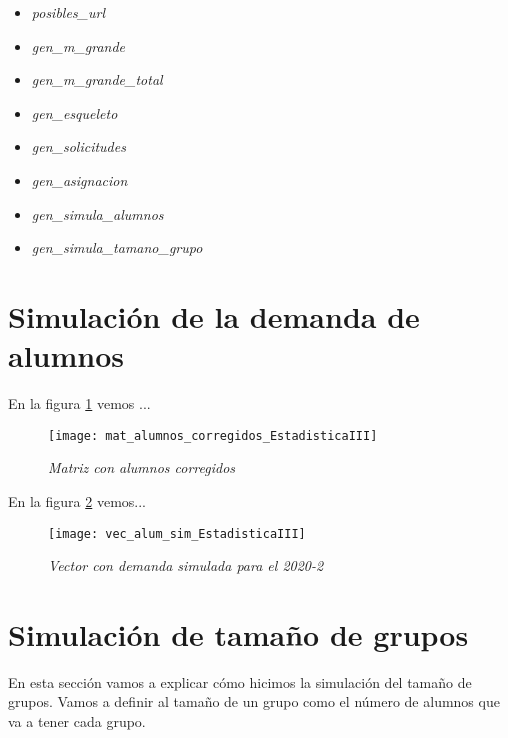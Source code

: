 \begin{itemize}
\item \textit{posibles\_url}

\item \textit{gen\_m\_grande}

\item \textit{gen\_m\_grande\_total}

\item \textit{gen\_esqueleto}

\item \textit{gen\_solicitudes}

\item \textit{gen\_asignacion}

\item \textit{gen\_simula\_alumnos}

\item \textit{gen\_simula\_tamano\_grupo}
\end{itemize}


\section{Simulación de la demanda de alumnos}

En la figura \ref{matAl_corregidos} vemos ...

\begin{figure}[H]
\centering
\texttt{[image: mat\_alumnos\_corregidos\_EstadisticaIII]} %
\caption{\textit{Matriz con alumnos corregidos}}\label{matAl_corregidos}
\end{figure}

En la figura \ref{vec_alum_sim} vemos...

\begin{figure}[H]
\centering
\texttt{[image: vec\_alum\_sim\_EstadisticaIII]} %
\caption{\textit{Vector con demanda simulada para el 2020-2}}\label{vec_alum_sim}
\end{figure}



\section{Simulación de tamaño de grupos} \label{SimTamGpos}

En esta sección vamos a explicar cómo hicimos la simulación del tamaño de grupos. Vamos a definir al tamaño de un grupo como el número de alumnos que va a tener cada grupo.






